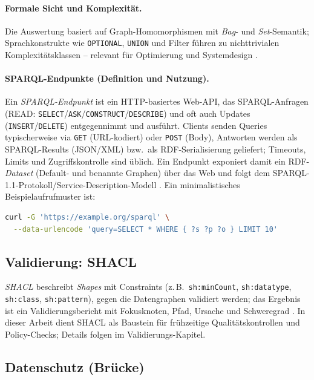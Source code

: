 \paragraph{Formale Sicht und Komplexität.}
Die Auswertung basiert auf Graph-Homomorphismen mit \emph{Bag}- und \emph{Set}-Semantik; Sprachkonstrukte wie \texttt{OPTIONAL}, \texttt{UNION} und Filter führen zu nichttrivialen Komplexitätsklassen -- relevant für Optimierung und Systemdesign \cite{perezGutierrezSparql}.

\paragraph{SPARQL-Endpunkte (Definition und Nutzung).}
Ein \emph{SPARQL-Endpunkt} ist ein HTTP-basiertes Web-API, das SPARQL-Anfragen (READ: \texttt{SELECT}/\texttt{ASK}/\texttt{CONSTRUCT}/\texttt{DESCRIBE}) und oft auch Updates (\texttt{INSERT}/\texttt{DELETE}) entgegennimmt und ausführt. Clients senden Queries typischerweise via \texttt{GET} (URL-kodiert) oder \texttt{POST} (Body), Antworten werden als SPARQL-Results (JSON/XML) bzw.\ als RDF-Serialisierung geliefert; Timeouts, Limits und Zugriffskontrolle sind üblich. Ein Endpunkt exponiert damit ein RDF-\emph{Dataset} (Default- und benannte Graphen) über das Web und folgt dem SPARQL-1.1-Protokoll/Service-Description-Modell \cite{SPARQL11Overview}. Ein minimalistisches Beispielaufrufmuster ist:
\begin{lstlisting}[language=bash]
curl -G 'https://example.org/sparql' \
  --data-urlencode 'query=SELECT * WHERE { ?s ?p ?o } LIMIT 10'
\end{lstlisting}

\subsection{Validierung: SHACL}

\emph{SHACL} beschreibt \emph{Shapes} mit Constraints (z.\,B.\ \texttt{sh:minCount}, \texttt{sh:datatype}, \texttt{sh:class}, \texttt{sh:pattern}), gegen die Datengraphen validiert werden; das Ergebnis ist ein Validierungsbericht mit Fokusknoten, Pfad, Ursache und Schweregrad \cite{SHACL12}. In dieser Arbeit dient SHACL als Baustein für frühzeitige Qualitätskontrollen und Policy-Checks; Details folgen im Validierungs-Kapitel.


\subsection{Datenschutz (Brücke)}


